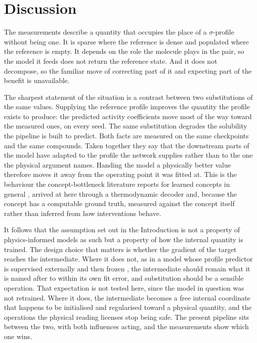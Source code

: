 \section{Discussion}
\label{sec:discussion}

The measurements describe a quantity that occupies the place of a $\sigma$-profile without being
one. It is sparse where the reference is dense and populated where the reference is empty. It depends on the role the molecule plays in the pair, so the model it feeds does not return the reference state. And it does not decompose, so the familiar move of correcting part of it and expecting part of the benefit is unavailable.

The sharpest statement of the situation is a contrast between two substitutions of the same
values. Supplying the reference profile improves the quantity the profile exists to produce: the
predicted activity coefficients move most of the way toward the measured ones, on every seed. The
same substitution degrades the solubility the pipeline is built to predict. Both facts are measured
on the same checkpoints and the same compounds. Taken together they say that the downstream parts of the model have adapted to the profile the network supplies rather than to the one the physical argument names. Handing the model a physically better value therefore moves it away from the operating point it was fitted at. This is the behaviour the concept-bottleneck literature reports
for learned concepts in general \cite{koh2020cbm,margeloiu2021}, arrived at here through a
thermodynamic decoder and, because the concept has a computable ground truth, measured against the
concept itself rather than inferred from how interventions behave.

It follows that the assumption set out in the Introduction is not a property of physics-informed
models as such but a property of how the internal quantity is trained. The design choice that
matters is whether the gradient of the target reaches the intermediate. Where it does not, as in a
model whose profile predictor is supervised externally and then frozen \cite{yang2025tennet}, the
intermediate should remain what it is named after to within its own fit error, and substitution
should be a sensible operation. That expectation is not tested here, since the model in question
was not retrained. Where it does, the intermediate becomes a free internal coordinate that happens
to be initialised and regularised toward a physical quantity, and the operations the physical
reading licenses stop being safe. The present pipeline sits between the two, with both influences
acting, and the measurements show which one wins.

